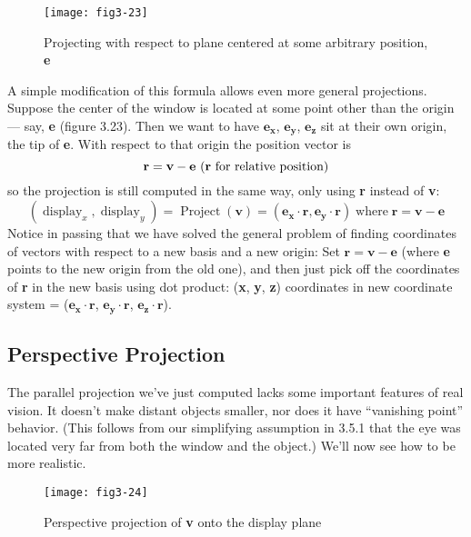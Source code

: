 \documentclass{book}
\begin{document}
\begin{figure}
\begin{center}
\texttt{[image: fig3-23]}
\caption{Projecting with respect to plane centered at some arbitrary position, \textbf{e}}
\end{center}
\end{figure}

A simple modification of this formula allows even more general projections. Suppose the center of the window is located at some point other
than the origin --- 
say, \textbf{e} (figure 3.23). Then we want to have $\mathbf{e_x}$, $\mathbf{e_y}$, $\mathbf{e_z}$ sit
at their own origin, the tip of \textbf{e}. With respect to that origin the position
vector is
$$\mathbf{r} = \mathbf{v} - \mathbf{e} \text{ (\textbf{r} for relative position)}$$
 so the projection is still computed in the same way, only using \textbf{r} instead
of \textbf{v}:
$$(\operatorname{display}_x, \operatorname{display}_y) = \operatorname{Project}(\textbf{v}) = (\mathbf{e_x} \cdot \mathbf{r}, \mathbf{e_y} \cdot \mathbf{r}) \operatorname{where} \mathbf{r} = \mathbf{v} - \mathbf{e}$$
Notice in passing that we have solved the general problem of finding
coordinates of vectors with respect to a new basis and a new origin: Set
$\mathbf{r} = \mathbf{v} - \mathbf{e}$ (where \textbf{e} points to the new origin from the old one), and then
just pick off the coordinates of \textbf{r} in the new basis using dot product:
(\textbf{x}, \textbf{y}, \textbf{z}) coordinates in new coordinate system = ($\mathbf{e_x} \cdot \mathbf{r}$, $\mathbf{e_y} \cdot \mathbf{r}$, $\mathbf{e_z} \cdot \mathbf{r}$).

\subsection{Perspective Projection}

The parallel projection we've just computed lacks some important features of real vision. It doesn't make distant objects smaller, nor does
it have ``vanishing point'' behavior. (This follows from our simplifying
assumption in 3.5.1 that the eye was located very far from both the
window and the object.) We'll now see how to be more realistic.

\begin{figure}
\begin{center}
\texttt{[image: fig3-24]}
\caption{Perspective projection of \textbf{v} onto the display plane}
\end{center}
\end{figure}
\end{document}

